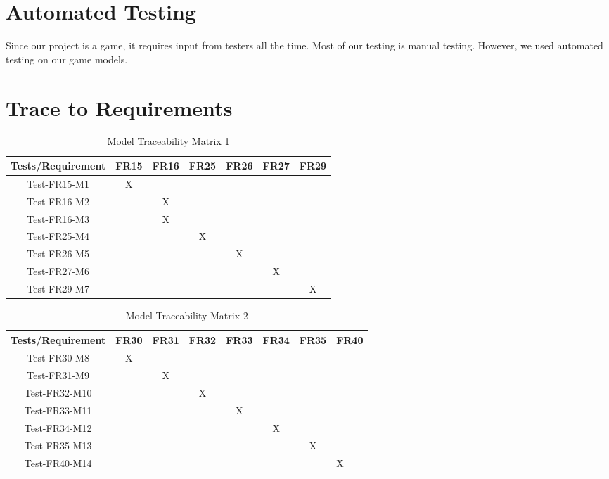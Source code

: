 \documentclass[12pt, titlepage]{article}
\begin{document}
\section{Automated Testing}
Since our project is a game, it requires input from testers all the time. Most of 
our testing is manual testing. However, we used automated testing on our 
game models.
\section{Trace to Requirements}
\begin{table}[htp]
\centering
\caption{Model Traceability Matrix 1}
\begin{tabular}{|c|c|c|c|c|c|c|}
\hline
Tests/Requirement & FR15 & FR16 & FR25 & FR26 & FR27 & FR29 \\
\hline
Test-FR15-M1      & X    &      &      &      &      &      \\
\hline
Test-FR16-M2      &      & X    &      &      &      &      \\
\hline
Test-FR16-M3      &      & X    &      &      &      &      \\
\hline
Test-FR25-M4      &      &      & X    &      &      &      \\
\hline
Test-FR26-M5      &      &      &      & X    &      &      \\
\hline
Test-FR27-M6      &      &      &      &      & X    &      \\
\hline
Test-FR29-M7      &      &      &      &      &      & X\\
\hline   
\end{tabular}
\end{table}

\begin{table}[htp]
\centering
\caption{Model Traceability Matrix 2}
\begin{tabular}{|c|c|c|c|c|c|c|l|}
\hline
Tests/Requirement & FR30 & FR31 & FR32 & FR33 & FR34 & FR35 & FR40 \\
\hline
Test-FR30-M8      & X    &      &      &      &      &        &      \\
\hline
Test-FR31-M9      &      & X    &      &      &      &        &      \\
\hline
Test-FR32-M10     &      &      & X    &      &      &        &      \\
\hline
Test-FR33-M11     &      &      &      & X    &      &        &      \\
\hline
Test-FR34-M12     &      &      &      &      & X    &        &      \\
\hline
Test-FR35-M13   &      &      &      &      &      & X      &      \\
\hline
Test-FR40-M14     &      &      &      &      &      &        & X   \\
\hline
\end{tabular}
\end{table}
\end{document}

